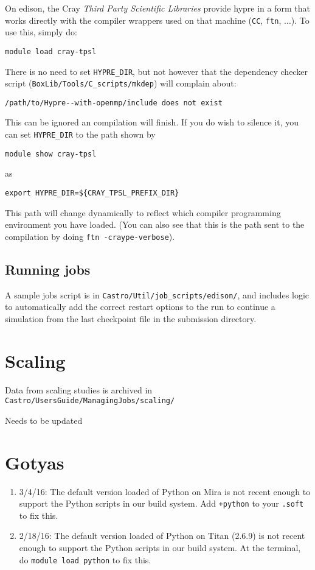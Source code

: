 On edison, the Cray {\em Third Party Scientific Libraries} provide
{\sf hypre} in a form that works directly with the compiler wrappers
used on that machine ({\tt CC}, {\tt ftn}, $\ldots$).  To use this,
simply do:
\begin{verbatim}
module load cray-tpsl
\end{verbatim}
There is no need to set {\tt HYPRE\_DIR}, but not however that the 
dependency checker script ({\tt BoxLib/Tools/C\_scripts/mkdep}) will
complain about:
\begin{verbatim}
/path/to/Hypre--with-openmp/include does not exist
\end{verbatim}
This can be ignored an compilation will finish.  If you do wish to 
silence it, you can set {\tt HYPRE\_DIR} to the path shown by
\begin{verbatim}
module show cray-tpsl
\end{verbatim}
as
\begin{verbatim}
export HYPRE_DIR=${CRAY_TPSL_PREFIX_DIR}
\end{verbatim}
This path will change dynamically to reflect which compiler programming
environment you have loaded.  (You can also see that this is the path
sent to the compilation by doing {\tt ftn -craype-verbose}).


\subsection{Running jobs}

A sample jobs script is in {\tt Castro/Util/job\_scripts/edison/}, and 
includes logic to automatically add the correct restart options to the 
run to continue a simulation from the last checkpoint file in the 
submission directory.



\section{Scaling}

Data from scaling studies is archived in {\tt Castro/UsersGuide/ManagingJobs/scaling/}

Needs to be updated



\section{Gotyas}

\begin{enumerate}

\item 3/4/16: The default version loaded of Python on Mira is not
  recent enough to support the Python scripts in our build system. Add
  {\tt +python} to your {\tt .soft} to fix this.

\item 2/18/16: The default version loaded of Python on Titan (2.6.9)
  is not recent enough to support the Python scripts in our build
  system. At the terminal, do {\tt module load python} to fix this.


\end{enumerate}

